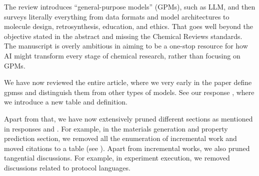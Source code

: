 \begin{point}
The review introduces ``general-purpose models'' (GPMs), such as LLM, and then surveys literally everything from data formats and model architectures to molecule design, retrosynthesis, education, and ethics. That goes well beyond the objective stated in the abstract and missing the Chemical Reviews standards. The manuscript is overly ambitious in aiming to be a one-stop resource for how AI might transform every stage of chemical research, rather than focusing on GPMs.
\end{point}

\begin{reply}
\label{reply:prune}
We have now reviewed the entire article, where we very early in the paper define \glspl{gpms} and distinguish them from other types of models. See our response , where we introduce a new table and definition.

Apart from that, we have now extensively pruned different sections as mentioned in responses  and .
For example, in the materials generation and property prediction section, we removed all the enumeration of incremental work and moved citations to a table (see ). Apart from incremental works, we also pruned tangential discussions. For example, in experiment execution, we removed discussions related to protocol languages.


\end{reply}
